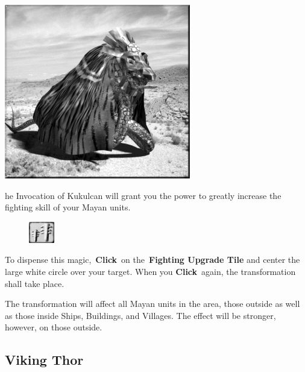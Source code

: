 
\begin{center}
	\includegraphics[width=.9\linewidth]{Akukulcan}
\end{center}

he Invocation of Kukulcan will grant you the power to greatly increase the fighting skill of your Mayan units.

\begin{figure}
	\vspace{-20pt}
	\begin{center}
		\includegraphics[width=0.1\textwidth]{Tfightupgrade}
	\end{center}
	\vspace{-20pt}
\end{figure}

To dispense this magic, \textbf{Click} on the \textbf{Fighting Upgrade Tile} and center the large white circle over your target. When you \textbf{Click} again, the transformation shall take place.

The transformation will affect all Mayan units in the area, those outside as well as those inside Ships, Buildings, and Villages. The effect will be stronger, however, on those outside.

\subsection{Viking Thor}

